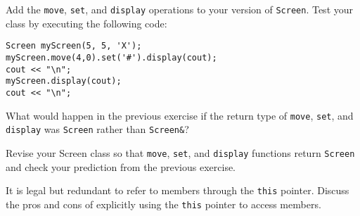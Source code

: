 %
%
\begin{question}
Add the \verb|move|, \verb|set|, and \verb|display| operations to your
version of \verb|Screen|. Test your class by executing the following code:
\begin{lstlisting}
Screen myScreen(5, 5, 'X');
myScreen.move(4,0).set('#').display(cout);
cout << "\n";
myScreen.display(cout);
cout << "\n";
\end{lstlisting}
\end{question}

\begin{question}
What would happen in the previous exercise if the return
type of \verb|move|, \verb|set|, and \verb|display| was \verb|Screen| rather than \verb|Screen&|?
\end{question}

\begin{question}
Revise your Screen class so that \verb|move|, \verb|set|, and \verb|display|
functions return \verb|Screen| and check your prediction from the previous
exercise.
\end{question}

\begin{question}
It is legal but redundant to refer to members through the
\verb|this| pointer. Discuss the pros and cons of explicitly using the \verb|this| pointer
to access members.
\end{question}
